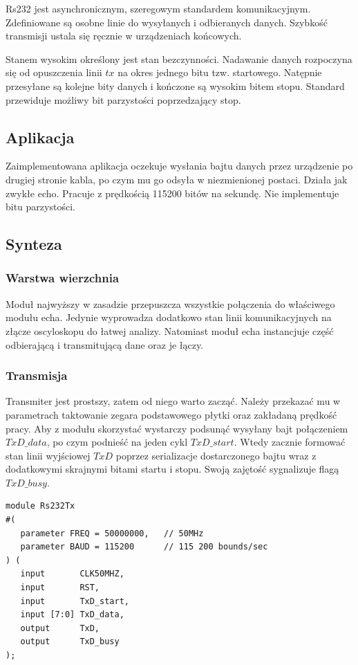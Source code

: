 \documentclass[a4paper,12pt]{article}
\begin{document}
Rs232 jest asynchronicznym, szeregowym standardem komunikacyjnym. Zdefiniowane są osobne linie do wysyłanych i odbieranych danych. Szybkość transmisji ustala się ręcznie w urządzeniach końcowych.

Stanem wysokim określony jest stan bezczynności. Nadawanie danych rozpoczyna się od opuszczenia linii $tx$ na okres jednego bitu tzw. startowego. Natępnie przesyłane są kolejne bity danych i kończone są wysokim bitem stopu. Standard przewiduje możliwy bit parzystości poprzedzający stop.

\subsection{Aplikacja}
Zaimplementowana aplikacja oczekuje wysłania bajtu danych przez urządzenie po drugiej stronie kabla, po czym mu go odsyła w niezmienionej postaci. Działa jak zwykłe echo. Pracuje z prędkością 115200 bitów na sekundę. Nie implementuje bitu parzystości.

\subsection{Synteza}

\subsubsection{Warstwa wierzchnia}

Moduł najwyższy w zasadzie przepuszcza wszystkie połączenia do właściwego modułu echa. Jedynie wyprowadza dodatkowo stan linii komunikacyjnych na złącze oscyloskopu do łatwej analizy. Natomiast moduł echa instancjuje część odbierającą i transmitującą dane oraz je łączy.



\subsubsection{Transmisja}
Transmiter jest prostszy, zatem od niego warto zacząć. Należy przekazać mu w parametrach taktowanie zegara podstawowego płytki oraz zakładaną prędkość pracy. Aby z modułu skorzystać wystarczy podsunąć wysyłany bajt połączeniem $TxD\_data$, po czym podnieść na jeden cykl $TxD\_start$. Wtedy zacznie formować stan linii wyjściowej $TxD$ poprzez serializacje dostarczonego bajtu wraz z dodatkowymi skrajnymi bitami startu i stopu. Swoją zajętość sygnalizuje flagą $TxD\_busy$.
\begin{lstlisting}[label=Rs232Tx,caption=Rs232Tx.v]
module Rs232Tx
#(
   parameter FREQ = 50000000,   // 50MHz
   parameter BAUD = 115200      // 115 200 bounds/sec
) (
   input       CLK50MHZ,
   input       RST,
   input       TxD_start,
   input [7:0] TxD_data,
   output      TxD,
   output      TxD_busy
);
\end{lstlisting}
\end{document}
